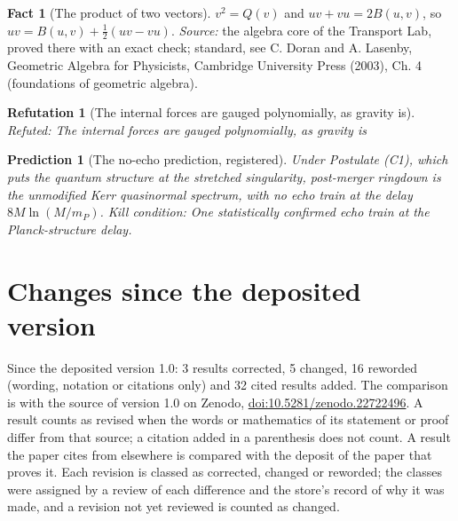 \documentclass[11pt]{article}
\newtheorem{refutation}[theorem]{Refutation}
\newtheorem{prediction}[theorem]{Prediction}
\theoremstyle{definition}
\newtheorem{fact}[theorem]{Fact}
\theoremstyle{plain}
\begin{document}
\begin{fact}[The product of two vectors]\label{c:std-algebra.vector-squares}
$v^{2} = Q(v)$ and $uv + vu = 2B(u, v)$, so $uv = B(u, v) + \tfrac12(uv - vu)$.
\emph{Source:} the algebra core of the Transport Lab, proved there with an exact check; standard, see C. Doran and A. Lasenby, Geometric Algebra for Physicists, Cambridge University Press (2003), Ch. 4 (foundations of geometric algebra).
\end{fact}

\begin{refutation}[The internal forces are gauged polynomially, as gravity is]\label{c:refuted.the-internal-forces-are-gauged-polynomially-as-g}
Refuted: The internal forces are gauged polynomially, as gravity is
\end{refutation}

\begin{prediction}[The no-echo prediction, registered]\label{c:scrambling.no-echo-prediction-registered}
Under Postulate (C1), which puts the quantum structure at the stretched singularity, post-merger ringdown is the unmodified Kerr quasinormal spectrum, with no echo train at the delay $8M\ln(M/m_P)$.
\emph{Kill condition:} One statistically confirmed echo train at the Planck-structure delay.
\end{prediction}

\section*{Changes since the deposited version}
Since the deposited version 1.0: 3 results corrected, 5 changed, 16 reworded (wording, notation or citations only) and 32 cited results added. The comparison is with the source of version 1.0 on Zenodo, \href{https://doi.org/10.5281/zenodo.22722496}{doi:10.5281/zenodo.22722496}. A result counts as revised when the words or mathematics of its statement or proof differ from that source; a citation added in a parenthesis does not count. A result the paper cites from elsewhere is compared with the deposit of the paper that proves it. Each revision is classed as corrected, changed or reworded; the classes were assigned by a review of each difference and the store's record of why it was made, and a revision not yet reviewed is counted as changed.
\end{document}
